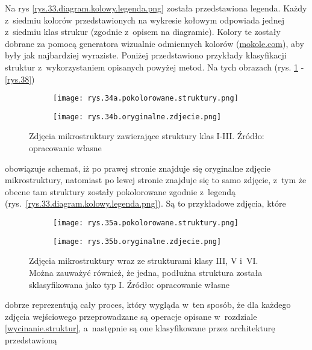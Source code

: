 Na rys \ref{rys.33.diagram.kolowy.legenda.png} została przedstawiona legenda. Każdy z~siedmiu kolorów przedstawionych na wykresie kołowym odpowiada jednej z~siedmiu klas strukur (zgodnie z~opisem na diagramie). Kolory te zostały dobrane za pomocą generatora wizualnie odmiennych kolorów (\href{https://mokole.com/palette.html}{mokole.com}), aby były jak najbardziej wyraziste. Poniżej przedstawiono przykłady klasyfikacji struktur z~wykorzystaniem opisanych powyżej metod. Na tych obrazach (rys. \ref{rys.34} - \ref{rys.38}) 
\begin{figure}[h]
	\centering
	\begin{subfigure}{0.42\textwidth}
	    \centering
	    \texttt{[image: rys.34a.pokolorowane.struktury.png]}
	\end{subfigure}
	\begin{subfigure}{0.42\textwidth}
	    \centering
	    \texttt{[image: rys.34b.oryginalne.zdjecie.png]}
	\end{subfigure}
	\caption{\label{rys.34}Zdjęcia mikrostruktury zawierające struktury klas I-III. Źródło: opracowanie własne}
\end{figure}
obowiązuje schemat, iż po prawej stronie znajduje się oryginalne zdjęcie mikrostruktury, natomiast po lewej stronie znajduje się to samo zdjęcie, z~tym że obecne tam struktury zostały pokolorowane zgodnie z~legendą (rys.~\ref{rys.33.diagram.kolowy.legenda.png}). Są to przykładowe zdjęcia, które 
\begin{figure}[h]
	\centering
	\begin{subfigure}{0.42\textwidth}
	    \centering
	    \texttt{[image: rys.35a.pokolorowane.struktury.png]}
	\end{subfigure}
	\begin{subfigure}{0.42\textwidth}
	    \centering
	    \texttt{[image: rys.35b.oryginalne.zdjecie.png]}
	\end{subfigure}
	\caption{\label{rys.35}Zdjęcia mikrostruktury wraz ze strukturami klasy III, V i~VI. Można zauważyć również, że jedna, podłużna struktura została sklasyfikowana jako typ I. Źródło: opracowanie własne}
\end{figure}
dobrze reprezentują cały proces, który wygląda w~ten sposób, że dla każdego zdjęcia wejściowego przeprowadzane są operacje opisane w~rozdziale \ref{wycinanie.struktur}, a~następnie są one klasyfikowane przez architekturę przedstawioną
